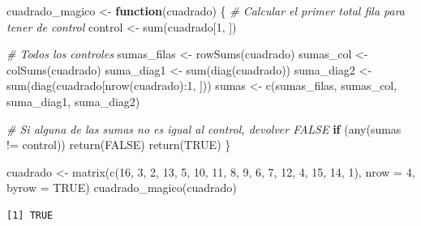 \documentclass[
]{book}
\newenvironment{Shaded}{\begin{snugshade}}{\end{snugshade}}
\newcommand{\AttributeTok}[1]{\textcolor[rgb]{0.77,0.63,0.00}{#1}}
\newcommand{\CommentTok}[1]{\textcolor[rgb]{0.56,0.35,0.01}{\textit{#1}}}
\newcommand{\ConstantTok}[1]{\textcolor[rgb]{0.00,0.00,0.00}{#1}}
\newcommand{\ControlFlowTok}[1]{\textcolor[rgb]{0.13,0.29,0.53}{\textbf{#1}}}
\newcommand{\DecValTok}[1]{\textcolor[rgb]{0.00,0.00,0.81}{#1}}
\newcommand{\FunctionTok}[1]{\textcolor[rgb]{0.00,0.00,0.00}{#1}}
\newcommand{\NormalTok}[1]{#1}
\newcommand{\OtherTok}[1]{\textcolor[rgb]{0.56,0.35,0.01}{#1}}
\newcommand{\SpecialCharTok}[1]{\textcolor[rgb]{0.00,0.00,0.00}{#1}}
\begin{document}
\begin{Shaded}
\begin{Highlighting}[]
\NormalTok{cuadrado\_magico }\OtherTok{\textless{}{-}} \ControlFlowTok{function}\NormalTok{(cuadrado) \{}
    \CommentTok{\# Calcular el primer total fila para tener de control}
\NormalTok{  control }\OtherTok{\textless{}{-}} \FunctionTok{sum}\NormalTok{(cuadrado[}\DecValTok{1}\NormalTok{, ])}
  
  \CommentTok{\# Todos los controles}
\NormalTok{  sumas\_filas }\OtherTok{\textless{}{-}} \FunctionTok{rowSums}\NormalTok{(cuadrado)}
\NormalTok{  sumas\_col }\OtherTok{\textless{}{-}} \FunctionTok{colSums}\NormalTok{(cuadrado)}
\NormalTok{  suma\_diag1 }\OtherTok{\textless{}{-}} \FunctionTok{sum}\NormalTok{(}\FunctionTok{diag}\NormalTok{(cuadrado))}
\NormalTok{  suma\_diag2 }\OtherTok{\textless{}{-}} \FunctionTok{sum}\NormalTok{(}\FunctionTok{diag}\NormalTok{(cuadrado[}\FunctionTok{nrow}\NormalTok{(cuadrado)}\SpecialCharTok{:}\DecValTok{1}\NormalTok{, ]))}
\NormalTok{  sumas }\OtherTok{\textless{}{-}} \FunctionTok{c}\NormalTok{(sumas\_filas, sumas\_col, suma\_diag1, suma\_diag2)}
  
  \CommentTok{\# Si alguna de las sumas no es igual al control, devolver FALSE}
  \ControlFlowTok{if}\NormalTok{ (}\FunctionTok{any}\NormalTok{(sumas }\SpecialCharTok{!=}\NormalTok{ control)) }\FunctionTok{return}\NormalTok{(}\ConstantTok{FALSE}\NormalTok{)}
  \FunctionTok{return}\NormalTok{(}\ConstantTok{TRUE}\NormalTok{)}
\NormalTok{\}}

\NormalTok{cuadrado }\OtherTok{\textless{}{-}} \FunctionTok{matrix}\NormalTok{(}\FunctionTok{c}\NormalTok{(}\DecValTok{16}\NormalTok{,  }\DecValTok{3}\NormalTok{,  }\DecValTok{2}\NormalTok{, }\DecValTok{13}\NormalTok{,}
                      \DecValTok{5}\NormalTok{, }\DecValTok{10}\NormalTok{, }\DecValTok{11}\NormalTok{,  }\DecValTok{8}\NormalTok{,}
                      \DecValTok{9}\NormalTok{,  }\DecValTok{6}\NormalTok{,  }\DecValTok{7}\NormalTok{, }\DecValTok{12}\NormalTok{,}
                      \DecValTok{4}\NormalTok{, }\DecValTok{15}\NormalTok{, }\DecValTok{14}\NormalTok{,  }\DecValTok{1}\NormalTok{), }\AttributeTok{nrow =} \DecValTok{4}\NormalTok{, }\AttributeTok{byrow =} \ConstantTok{TRUE}\NormalTok{)}
\FunctionTok{cuadrado\_magico}\NormalTok{(cuadrado)}
\end{Highlighting}
\end{Shaded}

\begin{verbatim}
[1] TRUE
\end{verbatim}
\end{document}

